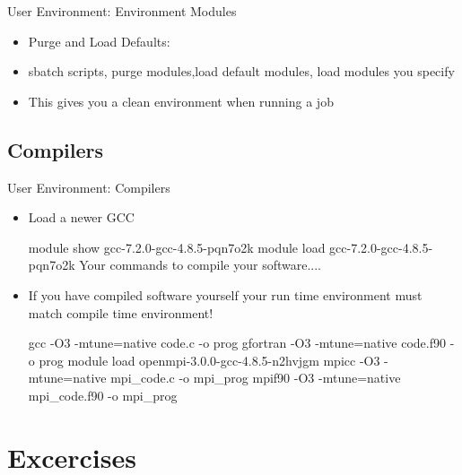 \begin{frame}[fragile]{User Environment: Environment Modules}
\begin{itemize}
\item{Purge and Load Defaults:}
\item{sbatch scripts, purge modules,load default modules, load modules you specify}
\item{This gives you a clean environment when running a job}
\smallskip
\end{itemize}
\end{frame}

\subsection{Compilers}
\begin{frame}[fragile]{User Environment: Compilers}
  \begin{itemize}
    \item{Load a newer GCC}
\begin{semiverbatim}
\scriptsize
module show gcc-7.2.0-gcc-4.8.5-pqn7o2k
module load gcc-7.2.0-gcc-4.8.5-pqn7o2k
Your commands to compile your software....
\end{semiverbatim}
\medskip
\item{If you have compiled software yourself your run time environment must match compile time environment!}

\begin{semiverbatim}
\scriptsize
gcc -O3 -mtune=native code.c -o prog
gfortran -O3 -mtune=native code.f90 -o prog
\medskip
module load openmpi-3.0.0-gcc-4.8.5-n2hvjgm
mpicc -O3 -mtune=native mpi_code.c -o mpi_prog
mpif90 -O3 -mtune=native mpi_code.f90 -o mpi_prog
\end{semiverbatim}
\pause
\end{itemize}
\end{frame}

\section{Excercises}

